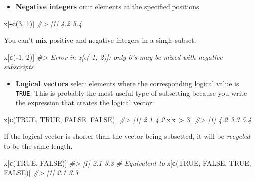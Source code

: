 \documentclass[]{book}
\newenvironment{Shaded}{\begin{snugshade}}{\end{snugshade}}
\newcommand{\KeywordTok}[1]{\textcolor[rgb]{0.13,0.29,0.53}{\textbf{#1}}}
\newcommand{\DecValTok}[1]{\textcolor[rgb]{0.00,0.00,0.81}{#1}}
\newcommand{\StringTok}[1]{\textcolor[rgb]{0.31,0.60,0.02}{#1}}
\newcommand{\CommentTok}[1]{\textcolor[rgb]{0.56,0.35,0.01}{\textit{#1}}}
\newcommand{\OtherTok}[1]{\textcolor[rgb]{0.56,0.35,0.01}{#1}}
\newcommand{\OperatorTok}[1]{\textcolor[rgb]{0.81,0.36,0.00}{\textbf{#1}}}
\newcommand{\NormalTok}[1]{#1}
\providecommand{\tightlist}{%
  \setlength{\itemsep}{0pt}\setlength{\parskip}{0pt}}
\theoremstyle{definition}
\theoremstyle{definition}
\theoremstyle{definition}
\theoremstyle{remark}
\begin{document}
\begin{itemize}
\tightlist
\item
  \textbf{Negative integers} omit elements at the specified positions
\end{itemize}

\begin{Shaded}
\begin{Highlighting}[]
\NormalTok{x[}\OperatorTok{-}\KeywordTok{c}\NormalTok{(}\DecValTok{3}\NormalTok{, }\DecValTok{1}\NormalTok{)]}
\CommentTok{#> [1] 4.2 5.4}
\end{Highlighting}
\end{Shaded}

You can't mix positive and negative integers in a single subset.

\begin{Shaded}
\begin{Highlighting}[]
\NormalTok{x[}\KeywordTok{c}\NormalTok{(}\OperatorTok{-}\DecValTok{1}\NormalTok{, }\DecValTok{2}\NormalTok{)]}
\CommentTok{#> Error in x[c(-1, 2)]: only 0's may be mixed with negative subscripts}
\end{Highlighting}
\end{Shaded}

\begin{itemize}
\tightlist
\item
  \textbf{Logical vectors} select elements where the corresponding
  logical value is \texttt{TRUE}. This is probably the most useful type
  of subsetting because you write the expression that creates the
  logical vector:
\end{itemize}

\begin{Shaded}
\begin{Highlighting}[]
\NormalTok{x[}\KeywordTok{c}\NormalTok{(}\OtherTok{TRUE}\NormalTok{, }\OtherTok{TRUE}\NormalTok{, }\OtherTok{FALSE}\NormalTok{, }\OtherTok{FALSE}\NormalTok{)]}
\CommentTok{#> [1] 2.1 4.2}
\NormalTok{x[x }\OperatorTok{>}\StringTok{ }\DecValTok{3}\NormalTok{]}
\CommentTok{#> [1] 4.2 3.3 5.4}
\end{Highlighting}
\end{Shaded}

If the logical vector is shorter than the vector being subsetted, it
will be \emph{recycled} to be the same length.

\begin{Shaded}
\begin{Highlighting}[]
\NormalTok{x[}\KeywordTok{c}\NormalTok{(}\OtherTok{TRUE}\NormalTok{, }\OtherTok{FALSE}\NormalTok{)]}
\CommentTok{#> [1] 2.1 3.3}
\CommentTok{# Equivalent to}
\NormalTok{x[}\KeywordTok{c}\NormalTok{(}\OtherTok{TRUE}\NormalTok{, }\OtherTok{FALSE}\NormalTok{, }\OtherTok{TRUE}\NormalTok{, }\OtherTok{FALSE}\NormalTok{)]}
\CommentTok{#> [1] 2.1 3.3}
\end{Highlighting}
\end{Shaded}
\end{document}
